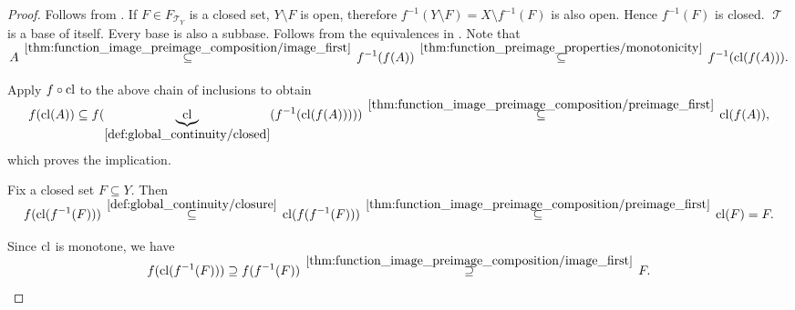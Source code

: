 \begin{proof}
   Follows from .
   If \( F \in F_{\mscrT_Y} \) is a closed set, \( Y \setminus F \) is open, therefore \( f^{-1}(Y \setminus F) = X \setminus f^{-1}(F) \) is also open. Hence \( f^{-1}(F) \) is closed.
   \( \mscrT \) is a base of itself.
   Every base is also a subbase.
   Follows from the equivalences in .
   Note that
  \begin{equation*}
    A
    \reloset {\ref{thm:function_image_preimage_composition/image_first}} \subseteq
    f^{-1}(f(A))
    \reloset {\ref{thm:function_preimage_properties/monotonicity}} \subseteq
    f^{-1}(\cl(f(A))).
  \end{equation*}

  Apply \( f \circ \operatorname{cl} \) to the above chain of inclusions to obtain
  \begin{equation*}
    f(\cl(A))
    \subseteq
    f(\underbrace{\cl}_{\ref{def:global_continuity/closed}}(f^{-1}(\cl(f(A)))))
    \reloset {\ref{thm:function_image_preimage_composition/preimage_first}} \subseteq
    \cl(f(A)),
  \end{equation*}
  which proves the implication.

   Fix a closed set \( F \subseteq Y \). Then
  \begin{equation}\label{def:global_continuity/closure_implies_closed_right}
    f(\cl(f^{-1}(F)))
    \reloset {\ref{def:global_continuity/closure}} \subseteq
    \cl(f(f^{-1}(F)))
    \reloset {\ref{thm:function_image_preimage_composition/preimage_first}} \subseteq
    \cl(F)
    =
    F.
  \end{equation}

  Since \( \operatorname{cl} \) is monotone, we have
  \begin{equation}\label{def:global_continuity/closure_implies_closed_left}
    f(\cl(f^{-1}(F)))
    \supseteq
    f(f^{-1}(F))
    \reloset {\ref{thm:function_image_preimage_composition/image_first}} \supseteq
    F.
  \end{equation}


\end{proof}
